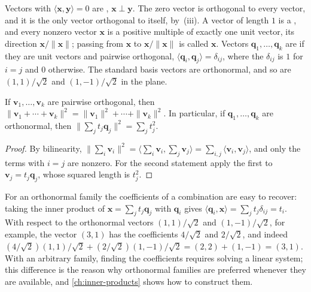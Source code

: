 Vectors with $\langle\mathbf x,\mathbf y\rangle=0$ are , $\mathbf x\perp\mathbf y$. The zero vector is orthogonal to every vector, and it is the only vector orthogonal to itself, by \,(iii). A vector of length $1$ is a , and every nonzero vector $\mathbf x$ is a positive multiple of exactly one unit vector, its direction $\mathbf x/\|\mathbf x\|$; passing from $\mathbf x$ to $\mathbf x/\|\mathbf x\|$ is called  $\mathbf x$. Vectors $\mathbf q_1,\ldots,\mathbf q_k$ are  if they are unit vectors and pairwise orthogonal, $\langle\mathbf q_i,\mathbf q_j\rangle=\delta_{ij}$, where the  $\delta_{ij}$ is $1$ for $i=j$ and $0$ otherwise. The standard basis vectors are orthonormal, and so are $(1,1)/\sqrt2$ and $(1,-1)/\sqrt2$ in the plane.

\begin{proposition}
\label{prop:pythagoras}
If $\mathbf v_1,\ldots,\mathbf v_k$ are pairwise orthogonal, then $\|\mathbf v_1+\cdots+\mathbf v_k\|^2=\|\mathbf v_1\|^2+\cdots+\|\mathbf v_k\|^2$. In particular, if $\mathbf q_1,\ldots,\mathbf q_k$ are orthonormal, then $\bigl\|\sum_jt_j\mathbf q_j\bigr\|^2=\sum_jt_j^2$.
\end{proposition}

\begin{proof}
By bilinearity, $\bigl\|\sum_i\mathbf v_i\bigr\|^2=\bigl\langle\sum_i\mathbf v_i,\sum_j\mathbf v_j\bigr\rangle=\sum_{i,j}\langle\mathbf v_i,\mathbf v_j\rangle$, and only the terms with $i=j$ are nonzero. For the second statement apply the first to $\mathbf v_j=t_j\mathbf q_j$, whose squared length is $t_j^2$.
\end{proof}

For an orthonormal family the coefficients of a combination are easy to recover: taking the inner product of $\mathbf x=\sum_jt_j\mathbf q_j$ with $\mathbf q_i$ gives $\langle\mathbf q_i,\mathbf x\rangle=\sum_jt_j\delta_{ij}=t_i$. With respect to the orthonormal vectors $(1,1)/\sqrt2$ and $(1,-1)/\sqrt2$, for example, the vector $(3,1)$ has the coefficients $4/\sqrt2$ and $2/\sqrt2$, and indeed $(4/\sqrt2)(1,1)/\sqrt2+(2/\sqrt2)(1,-1)/\sqrt2=(2,2)+(1,-1)=(3,1)$. With an arbitrary family, finding the coefficients requires solving a linear system; this difference is the reason why orthonormal families are preferred whenever they are available, and \cref{ch:inner-products} shows how to construct them.

